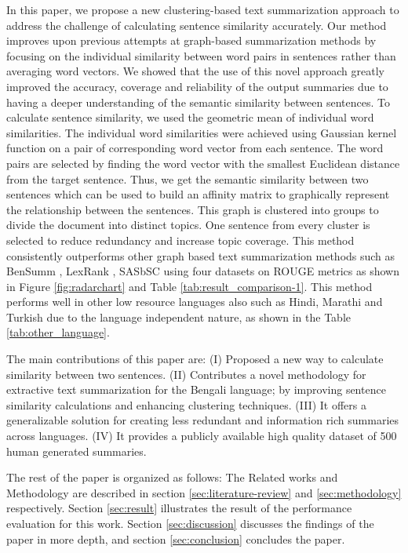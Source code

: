 \documentclass[acmlarge]{acmart}
\begin{document}
In this paper, we propose a new clustering-based text summarization approach to address the challenge of calculating sentence similarity accurately. Our method improves upon previous attempts at graph-based summarization methods \cite{chowdhury-etal-2021-tfidf-clustering, roychowdhury-etal-2022-spectral-base} by focusing on the individual similarity between word pairs in sentences rather than averaging word vectors. We showed that the use of this novel approach greatly improved the accuracy, coverage and reliability of the output summaries due to having a deeper understanding of the semantic similarity between sentences. To calculate sentence similarity, we used the geometric mean of individual word similarities. The individual word similarities were achieved using Gaussian kernel function on a pair of corresponding word vector from each sentence. The word pairs are selected by finding the word vector with the smallest Euclidean distance from the target sentence. Thus, we get the semantic similarity between two sentences which can be used to build an affinity matrix to graphically represent the relationship between the sentences. This graph is clustered into groups to divide the document into distinct topics. One sentence from every cluster is selected to reduce redundancy and increase topic coverage. This method consistently outperforms other graph based text summarization methods such as BenSumm \cite{chowdhury-etal-2021-tfidf-clustering}, LexRank \cite{Erkan-lexRank-2004}, SASbSC \cite{roychowdhury-etal-2022-spectral-base} using four datasets on ROUGE metrics \cite{lin-2004-rouge} as shown in Figure \ref{fig:radarchart} and Table \ref{tab:result_comparison-1}. This method performs well in other low resource languages also such as Hindi, Marathi and Turkish due to the language independent nature, as shown in the Table \ref{tab:other_language}.

The main contributions of this paper are:
(I) Proposed a new way to calculate similarity between two sentences.
(II) Contributes a novel methodology for extractive text summarization for the Bengali language; by improving sentence similarity calculations and enhancing clustering techniques.
(III) It offers a generalizable solution for creating less redundant and information rich summaries across languages.
(IV) It provides a publicly available high quality dataset of 500 human generated summaries.

The rest of the paper is organized as follows: The Related works and Methodology are described in section \ref{sec:literature-review} and \ref{sec:methodology} respectively. Section \ref{sec:result} illustrates the result of the performance evaluation for this work. Section \ref{sec:discussion} discusses the findings of the paper in more depth, and section \ref{sec:conclusion} concludes the paper.
\end{document}
